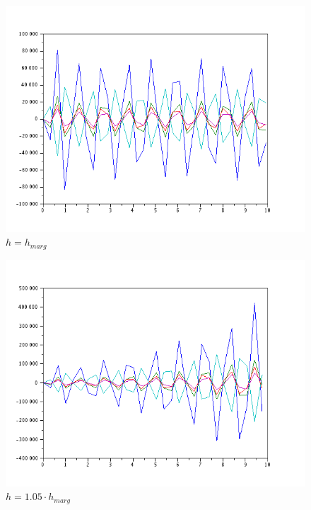 \documentclass{article}
\begin{document}
\begin{itemize}
\begin{figure}[H]
\includegraphics[width=\textwidth]{img/ej2-1-iii.png}
\caption{$h=h_{marg}$}
\end{figure}

\begin{figure}[H]
\includegraphics[width=\textwidth]{img/ej2-1-iv.png}
\caption{$h=1.05 \cdot h_{marg}$}
\end{figure}


\end{itemize}
\end{document}
